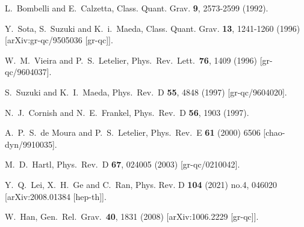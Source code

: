 \documentclass[aps,prd,showpacs,nofootinbib,floats,floatfix,preprintnumbers,groupedaddress,twocolumn]{revtex4-1}
\begin{document}
\begin{thebibliography}{9}
  L.~Bombelli and E.~Calzetta,
Class. Quant. Grav. \textbf{9}, 2573-2599 (1992).
  
Y.~Sota, S.~Suzuki and K.~i.~Maeda,
Class. Quant. Grav. \textbf{13}, 1241-1260 (1996)
[arXiv:gr-qc/9505036 [gr-qc]].
  
  W.~M.~Vieira and P.~S.~Letelier,
  Phys.\ Rev.\ Lett.\  {\bf 76}, 1409 (1996)
  [gr-qc/9604037].
  
  S.~Suzuki and K.~I.~Maeda,
  Phys.\ Rev.\ D {\bf 55}, 4848 (1997)
  [gr-qc/9604020].
  
 N.~J.~Cornish and N.~E.~Frankel,
   Phys.\ Rev.\ D {\bf 56}, 1903 (1997).
   
  A.~P.~S.~de Moura and P.~S.~Letelier,
  Phys.\ Rev.\ E {\bf 61} (2000) 6506
  [chao-dyn/9910035].
  
  M.~D.~Hartl,
  Phys.\ Rev.\ D {\bf 67}, 024005 (2003)
  [gr-qc/0210042].
  
Y.~Q.~Lei, X.~H.~Ge and C.~Ran,
Phys. Rev. D \textbf{104} (2021) no.4, 046020
[arXiv:2008.01384 [hep-th]].
 
  
  W.~Han,
  Gen.\ Rel.\ Grav.\  {\bf 40}, 1831 (2008)
  [arXiv:1006.2229 [gr-qc]].
  

\end{thebibliography}
\end{document}
